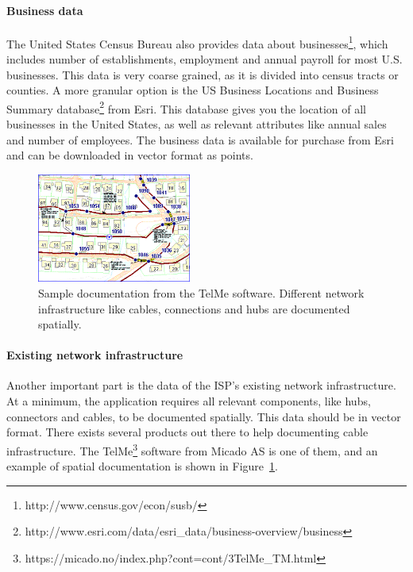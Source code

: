 \documentclass[twocolumn]{article}
\begin{document}
\paragraph{Business data}
\label{par:Business data}
The United States Census Bureau also provides data about businesses\footnote{http://www.census.gov/econ/susb/}, which includes number of establishments, employment and annual payroll for most U.S. businesses. This data is very coarse grained, as it is divided into census tracts or counties. A more granular  option is the US Business Locations and Business Summary database\footnote{http://www.esri.com/data/esri\_data/business-overview/business} from Esri. This database gives you the location of all businesses in the United States, as well as relevant attributes like annual sales and number of employees. The business data is available for purchase from Esri and can be downloaded in vector format as points.

\begin{figure}
  \centering
  \includegraphics[width=0.45\textwidth]{img/telme.png}
  \caption{Sample documentation from the TelMe software. Different network infrastructure like cables, connections and hubs are documented spatially.}
  \label{fig:telme}
\end{figure}
\paragraph{Existing network infrastructure}
\label{par:Existing network infrastructure}
Another important part is the data of the ISP's existing network infrastructure. At a minimum, the application requires all relevant components, like hubs, connectors and cables, to be documented spatially. This data should be in vector format. There exists several products out there to help documenting cable infrastructure. The TelMe\footnote{https://micado.no/index.php?cont=cont/3TelMe\_TM.html} software from Micado AS is one of them, and an example of spatial documentation is shown in Figure~\ref{fig:telme}.
\end{document}

